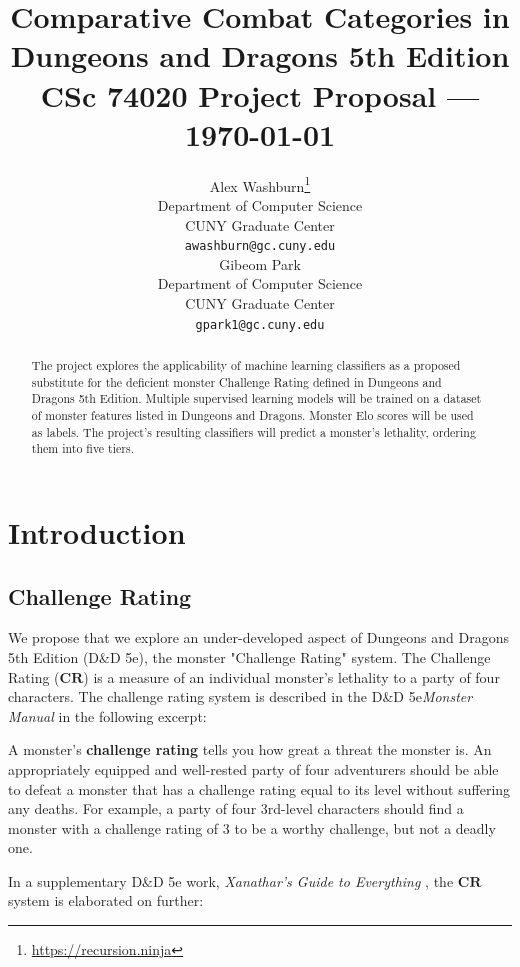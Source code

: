 \documentclass{article}
\title{Comparative Combat Categories in\\Dungeons and Dragons 5th Edition\\[5mm]\normalsize CSc 74020 Project Proposal --- \today}
\author{
  Alex Washburn\thanks{\url{https://recursion.ninja}} \\
  Department of Computer Science\\
  CUNY Graduate Center\\
  \texttt{awashburn@gc.cuny.edu} \\
  \And
  Gibeom Park\\
  Department of Computer Science\\
  CUNY Graduate Center\\
  \texttt{gpark1@gc.cuny.edu} \\
}
\newcommand{\CR}{\ensuremath{\mathbf{CR}}\xspace}
\newcommand{\DnD}{D\&D 5e\xspace}
\begin{document}


\maketitle

\begin{abstract}
The project explores the applicability of machine learning classifiers as a proposed substitute for the deficient monster Challenge Rating defined in Dungeons and Dragons 5th Edition.
Multiple supervised learning models will be trained on a dataset of monster features listed in Dungeons and Dragons.
Monster Elo scores will be used as labels.
The project's resulting classifiers will predict a monster's lethality, ordering them into five tiers.
\end{abstract}

\section{Introduction}


\subsection{Challenge Rating}

We propose that we explore an under-developed aspect of Dungeons and Dragons 5th Edition (\DnD), the monster "Challenge Rating" system.
The Challenge Rating (\CR) is a measure of an individual monster’s lethality to a party of four characters.
The challenge rating system is described in the \DnD \emph{Monster Manual} \cite{DnD5eMonsterManual2014} in the following excerpt:

\begin{displayquote}
	A monster's \textbf{challenge rating} tells you how great a threat the monster is.
	An appropriately equipped and well-rested party of four adventurers should be able to
	defeat a monster that has a challenge rating equal to its level without suffering any deaths.
	For example, a party of four 3rd-level characters should find a monster with a challenge rating of 3 to be a worthy challenge, but not a deadly one.
\end{displayquote}

In a supplementary \DnD work, \emph{Xanathar's Guide to Everything} \cite{DnD5eXanathars2017}, the \CR system is elaborated on further:
\end{document}
